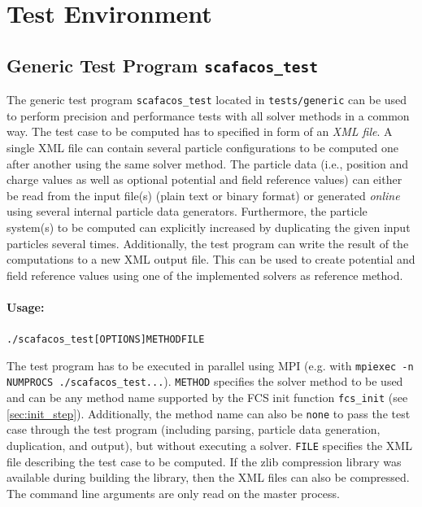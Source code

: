 \chapter{Test Environment}
\label{cha:tests}

\newcommand{\gentestexec}{scafacos\_test}
\newcommand{\gentestdir}{tests/generic}

\section{Generic Test Program \texttt{\gentestexec}}

\noindent
The generic test program \texttt{\gentestexec} located in \texttt{\gentestdir} can be used to perform precision and performance tests with all solver methods in a common way.
The test case to be computed has to specified in form of an \emph{XML file}.
A single XML file can contain several particle configurations to be computed one after another using the same solver method.
The particle data (i.e., position and charge values as well as optional potential and field reference values) can either be read from the input file(s) (plain text or binary format) or generated \emph{online} using several internal particle data generators.
Furthermore, the particle system(s) to be computed can explicitly increased by duplicating the given input particles several times.
Additionally, the test program can write the result of the computations to a new XML output file.
This can be used to create potential and field reference values using one of the implemented solvers as reference method.

\subsubsection*{Usage:}

\begin{alltt}
  ./\gentestexec [OPTIONS] METHOD FILE
\end{alltt}

\noindent
The test program has to be executed in parallel using MPI (e.g. with \texttt{mpiexec -n NUMPROCS ./\gentestexec ...}).
\texttt{METHOD} specifies the solver method to be used and can be any method name supported by the FCS init function \texttt{fcs\_init} (see \ref{sec:init_step}).
Additionally, the method name can also be \texttt{none} to pass the test case through the test program (including parsing, particle data generation, duplication, and output), but without executing a solver.
\texttt{FILE} specifies the XML file describing the test case to be computed.
If the zlib compression library was available during building the library, then the XML files can also be compressed.
The command line arguments are only read on the master process.

